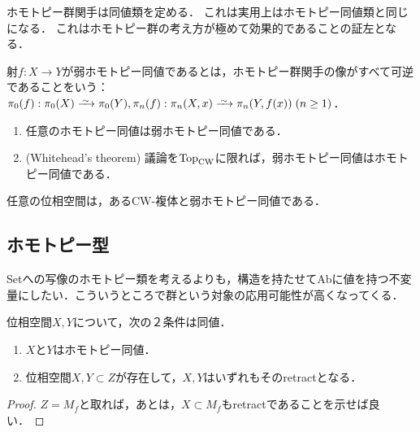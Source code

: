\documentclass[uplatex,dvipdfmx]{jsreport}
\begin{document}
\begin{tcolorbox}[colframe=ForestGreen, colback=ForestGreen!10!white,breakable,colbacktitle=ForestGreen!40!white,coltitle=black,fonttitle=\bfseries\sffamily,
title=]
    ホモトピー群関手は同値類を定める．
    これは実用上はホモトピー同値類と同じになる．
    これはホモトピー群の考え方が極めて効果的であることの証左となる．
\end{tcolorbox}

\begin{definition}
    射$f:X\to Y$が弱ホモトピー同値であるとは，ホモトピー群関手の像がすべて可逆であることをいう：$\pi_0(f):\pi_0(X)\iso\pi_0(Y),\pi_n(f):\pi_n(X,x)\iso\pi_n(Y,f(x))\;(n\ge 1)$．
\end{definition}

\begin{proposition}\mbox{}
    \begin{enumerate}
        \item 任意のホモトピー同値は弱ホモトピー同値である．
        \item (Whitehead's theorem) 議論を$\mathrm{Top}_{\mathrm{CW}}$に限れば，弱ホモトピー同値はホモトピー同値である．
    \end{enumerate}
\end{proposition}

\begin{proposition}[CW approximation]
    任意の位相空間は，あるCW-複体と弱ホモトピー同値である．
\end{proposition}

\subsection{ホモトピー型}

\begin{tcolorbox}[colframe=ForestGreen, colback=ForestGreen!10!white,breakable,colbacktitle=ForestGreen!40!white,coltitle=black,fonttitle=\bfseries\sffamily,
title=]
    Setへの写像のホモトピー類を考えるよりも，構造を持たせてAbに値を持つ不変量にしたい．こういうところで群という対象の応用可能性が高くなってくる．
\end{tcolorbox}

\begin{corollary}[ホモトピー同値性の特徴付け]
    位相空間$X,Y$について，次の２条件は同値．
    \begin{enumerate}
        \item $X$と$Y$はホモトピー同値．
        \item 位相空間$X,Y\subset Z$が存在して，$X,Y$はいずれもそのretractとなる．
    \end{enumerate}
\end{corollary}
\begin{proof}
    $Z=M_f$と取れば，あとは，$X\subset M_f$もretractであることを示せば良い．
\end{proof}
\end{document}

